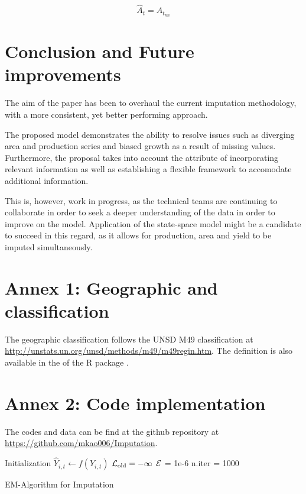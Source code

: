 \documentclass[nojss]{jss}\usepackage{graphicx, color}
\begin{document}
\begin{equation}
  \label{eq:locf}
  \hat{A}_t = A_{t_{nn}}
\end{equation}

\section{Conclusion and Future improvements}
The aim of the paper has been to overhaul the current imputation
methodology, with a more consistent, yet better performing approach.

The proposed model demonstrates the ability to resolve issues such as
diverging area and production series and biased growth as a result of
missing values. Furthermore, the proposal takes into account the
attribute of incorporating relevant information as well as
establishing a flexible framework to accomodate additional
information.

This is, however, work in progress, as the technical teams are
continuing to collaborate in order to seek a deeper understanding of
the data in order to improve on the model. Application of the
state-space model might be a candidate to succeed in this regard, as
it allows for production, area and yield to be imputed simultaneously.




\section*{Annex 1: Geographic and classification}

The geographic classification follows the UNSD M49 classification at
\url{http://unstats.un.org/unsd/methods/m49/m49regin.htm}. The
definition is also available in the  of the R
package .

\section*{Annex 2: Code implementation}

The codes and data can be find at the github repository at
\url{https://github.com/mkao006/Imputation}.

\begin{algorithm}
  \SetAlgoLined
  \BlankLine
  Initialization\;
  \Indp\Indp\Indp 
  $\hat{Y}_{i, t} \leftarrow f(Y_{i, t})$\;
  $\cal{L}_{\text{old}} = -\infty$\;
  $\cal{E}$ = 1e-6\;
  n.iter = 1000\;
  \Indm\Indm\Indm 
  
    \caption{EM-Algorithm for Imputation}
    \label{alg:imputation}
\end{algorithm}
  
\end{document}
